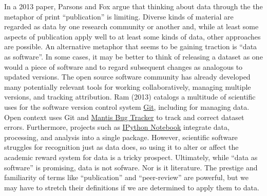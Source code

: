 \documentclass[10pt,twocolumn]{article}
\begin{document}
In a 2013 paper\cite{parsons_is_2013}, Parsons and Fox argue that thinking about data through the the metaphor of print ``publication'' is limiting.
Diverse kinds of material are regarded as data by one research community or another and, while at least some aspects of publication apply well to at least some kinds of data, other approaches are possible. %
An alternative metaphor that seems to be gaining traction is ``data as software''\cite{schopf_treating_2012}.
In some cases, it may be better to think of releasing a dataset as one would a piece of software and to regard subsequent changes as analogous to updated versions.
The open source software community has already developed many potentially relevant tools for working collaboratively, managing multiple versions, and tracking attribution.
Ram (2013)\cite{ram_git_2013} catalogs a multitude of scientific uses for the software version control system \href{http://git-scm.com/}{Git}, including for managing data.
Open context uses Git and \href{http://www.mantisbt.org/}{Mantis Bug Tracker} to track and correct dataset errors.
Furthermore, projects such as \href{http://ipython.org/notebook}{IPython Notebook} integrate data, processing, and analysis into a single package.
However, scientific software struggles for recognition\cite{pradal_publishing_2013} just as data does, so using it to alter or affect the academic reward system for data is a tricky prospect.
Ultimately, while ``data as software'' is promising, data is not sofware. Nor is it literature.
The prestige and familiarity of terms like ``publication'' and ``peer-review'' are powerful, but we may have to stretch their definitions if we are determined to apply them to data.

{\small
}








\end{document}
